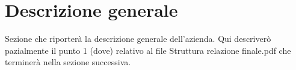 \section{Descrizione generale}

Sezione che riporterà la descrizione generale dell'azienda.
Qui descriverò pazialmente il punto 1 (dove) relativo al file Struttura relazione finale.pdf che terminerà nella sezione successiva.